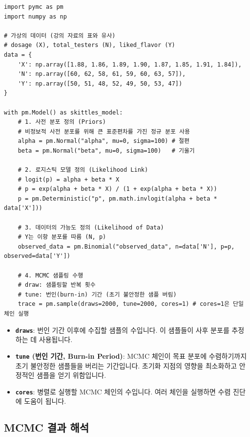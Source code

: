 \documentclass[11pt,a4paper]{book}
\theoremstyle{definition}
\begin{document}
\begin{lstlisting}[style=pythonstyle, caption={\texttt{pymc}를 이용한 MCMC 모델 설정 및 샘플링 예시}, label={lst:pymc_mcmc}]
import pymc as pm
import numpy as np

# 가상의 데이터 (강의 자료의 표와 유사)
# dosage (X), total_testers (N), liked_flavor (Y)
data = {
    'X': np.array([1.88, 1.86, 1.89, 1.90, 1.87, 1.85, 1.91, 1.84]),
    'N': np.array([60, 62, 58, 61, 59, 60, 63, 57]),
    'Y': np.array([50, 51, 48, 52, 49, 50, 53, 47])
}

with pm.Model() as skittles_model:
    # 1. 사전 분포 정의 (Priors)
    # 비정보적 사전 분포를 위해 큰 표준편차를 가진 정규 분포 사용
    alpha = pm.Normal("alpha", mu=0, sigma=100) # 절편
    beta = pm.Normal("beta", mu=0, sigma=100)   # 기울기

    # 2. 로지스틱 모델 정의 (Likelihood Link)
    # logit(p) = alpha + beta * X
    # p = exp(alpha + beta * X) / (1 + exp(alpha + beta * X))
    p = pm.Deterministic("p", pm.math.invlogit(alpha + beta * data['X']))

    # 3. 데이터의 가능도 정의 (Likelihood of Data)
    # Y는 이항 분포를 따름 (N, p)
    observed_data = pm.Binomial("observed_data", n=data['N'], p=p, observed=data['Y'])

    # 4. MCMC 샘플링 수행
    # draw: 샘플링할 반복 횟수
    # tune: 번인(burn-in) 기간 (초기 불안정한 샘플 버림)
    trace = pm.sample(draws=2000, tune=2000, cores=1) # cores=1은 단일 체인 실행
\end{lstlisting}

\begin{infobox}[title=MCMC 샘플링 과정의 주요 파라미터]
\begin{itemize}
    \item \textbf{\texttt{draws}}: 번인 기간 이후에 수집할 샘플의 수입니다. 이 샘플들이 사후 분포를 추정하는 데 사용됩니다.
    \item \textbf{\texttt{tune} (번인 기간, Burn-in Period)}: MCMC 체인이 목표 분포에 수렴하기까지 초기 불안정한 샘플들을 버리는 기간입니다. 초기화 지점의 영향을 최소화하고 안정적인 샘플을 얻기 위함입니다.
    \item \textbf{\texttt{cores}}: 병렬로 실행할 MCMC 체인의 수입니다. 여러 체인을 실행하면 수렴 진단에 도움이 됩니다.
\end{itemize}
\end{infobox}

\subsection*{MCMC 결과 해석}
\end{document}

